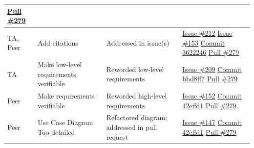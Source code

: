 \documentclass[12pt, titlepage]{article}
\begin{document}
\begin{longtable}{|p{2cm}|p{4cm}|p{5cm}|p{4cm}|}
\newline\href{https://github.com/OmarHassanAdelhamid/Five-of-a-Kind-capstone-project-/pull/279}{Pull \#279} \\ \hline
TA, Peer & Add citations & Addressed in issue(s) & \href{https://github.com/OmarHassanAdelhamid/Five-of-a-Kind-capstone-project-/issues/212}{Issue \#212}
\newline\href{https://github.com/OmarHassanAdelhamid/Five-of-a-Kind-capstone-project-/issues/153}{Issue \#153}
\newline\href{https://github.com/OmarHassanAdelhamid/Five-of-a-Kind-capstone-project-/pull/279/commits/36222462e30c9a9a412a427c719f7115df62a3c2}{Commit 3622246}
\newline\href{https://github.com/OmarHassanAdelhamid/Five-of-a-Kind-capstone-project-/pull/279}{Pull \#279} \\ \hline
TA & Make low-level requirements verifiable & Reworded low-level requirements & \href{https://github.com/OmarHassanAdelhamid/Five-of-a-Kind-capstone-project-/issues/209}{Issue \#209}
\newline\href{https://github.com/OmarHassanAdelhamid/Five-of-a-Kind-capstone-project-/pull/279/commits/bbd8ff7e7ffe140aca18d3cd53480f9ecd4beeba}{Commit bbd8ff7}
\newline\href{https://github.com/OmarHassanAdelhamid/Five-of-a-Kind-capstone-project-/pull/279}{Pull \#279} \\ \hline
Peer & Make requirements verifiable & Reworded high-level requirements & \href{https://github.com/OmarHassanAdelhamid/Five-of-a-Kind-capstone-project-/issues/152}{Issue \#152}
\newline\href{https://github.com/OmarHassanAdelhamid/Five-of-a-Kind-capstone-project-/pull/279/commits/42effd17a34adde7426efea55106c82f3724c94e}{Commit 42effd1}
\newline\href{https://github.com/OmarHassanAdelhamid/Five-of-a-Kind-capstone-project-/pull/279}{Pull \#279} \\ \hline
Peer & Use Case Diagram Too detailed & Refactored diagram; addressed in pull request & \href{https://github.com/OmarHassanAdelhamid/Five-of-a-Kind-capstone-project-/issues/147}{Issue \#147}
\newline\href{https://github.com/OmarHassanAdelhamid/Five-of-a-Kind-capstone-project-/pull/279/commits/42effd17a34adde7426efea55106c82f3724c94e}{Commit 42effd1}
\newline\href{https://github.com/OmarHassanAdelhamid/Five-of-a-Kind-capstone-project-/pull/279}{Pull \#279} \\ \hline

\end{longtable}
\end{document}
